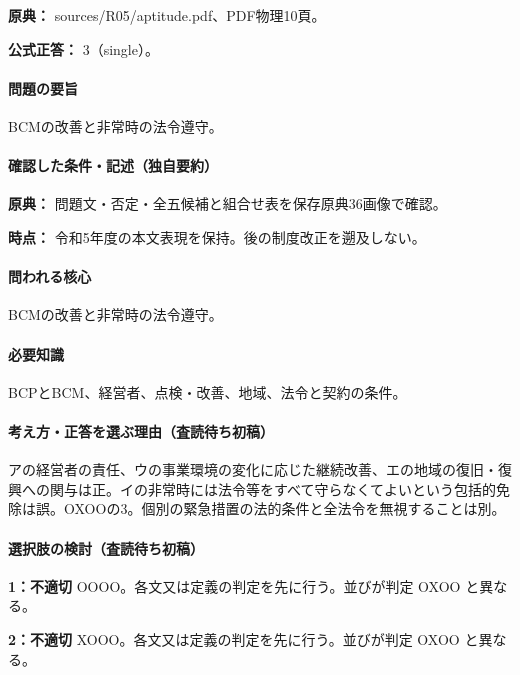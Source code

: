 \noindent\textbf{原典：} sources/R05/aptitude.pdf、PDF物理10頁。

\textbf{公式正答：} 3（single）。

\paragraph{問題の要旨} BCMの改善と非常時の法令遵守。

\paragraph{確認した条件・記述（独自要約）}\mbox{}\par

\noindent\textbf{原典：} 問題文・否定・全五候補と組合せ表を保存原典36画像で確認。\par

\noindent\textbf{時点：} 令和5年度の本文表現を保持。後の制度改正を遡及しない。\par

\paragraph{問われる核心} BCMの改善と非常時の法令遵守。

\paragraph{必要知識} BCPとBCM、経営者、点検・改善、地域、法令と契約の条件。

\paragraph{考え方・正答を選ぶ理由（査読待ち初稿）} アの経営者の責任、ウの事業環境の変化に応じた継続改善、エの地域の復旧・復興への関与は正。イの非常時には法令等をすべて守らなくてよいという包括的免除は誤。OXOOの3。個別の緊急措置の法的条件と全法令を無視することは別。

\paragraph{選択肢の検討（査読待ち初稿）}\mbox{}\par

\noindent\textbf{1：不適切} OOOO。各文又は定義の判定を先に行う。並びが判定 OXOO と異なる。\par

\noindent\textbf{2：不適切} XOOO。各文又は定義の判定を先に行う。並びが判定 OXOO と異なる。\par

